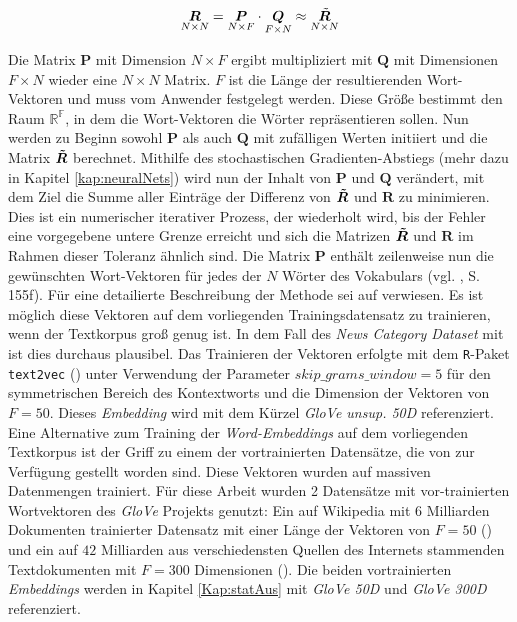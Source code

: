 \documentclass[a4paper,11pt]{article}
\begin{document}
\begin{equation*}
\underset{N \times N}{\bm{R}} = \underset{N \times F}{\bm{P}} \cdot \underset{F \times N}{\bm{Q}} \approx  \underset{N \times N}{\Tilde{\bm{R}}} 
\end{equation*}

Die Matrix $\bm{P}$ mit Dimension $N \times F$ ergibt multipliziert mit $\bm{Q}$ mit Dimensionen $F \times N$ wieder eine $N \times N$ Matrix. $F$ ist die Länge der resultierenden Wort-Vektoren und muss vom Anwender festgelegt werden. Diese Größe bestimmt den Raum $\mathbb{R^F}$, in dem die Wort-Vektoren die Wörter repräsentieren sollen. Nun werden zu Beginn sowohl $\bm{P}$ als auch $\bm{Q}$ mit zufälligen Werten initiiert und die Matrix $\bm{\Tilde{R}}$ berechnet. Mithilfe des stochastischen Gradienten-Abstiegs (mehr dazu in Kapitel \ref{kap:neuralNets}) wird nun der Inhalt von $\bm{P}$ und $\bm{Q}$ verändert, mit dem Ziel die Summe aller Einträge der Differenz von $\bm{\Tilde{R}}$ und $\bm{R}$ zu minimieren. Dies ist ein numerischer iterativer Prozess, der wiederholt wird, bis der Fehler eine vorgegebene untere Grenze erreicht und sich die Matrizen $\bm{\Tilde{R}}$ und $\bm{R}$ im Rahmen dieser Toleranz ähnlich sind. Die Matrix $\bm{P}$ enthält zeilenweise nun die gewünschten Wort-Vektoren für jedes der $N$ Wörter des Vokabulars (vgl. \cite{keras}, S. 155f). Für eine detailierte Beschreibung der Methode sei auf \cite{glovePaper} verwiesen. 
Es ist möglich diese Vektoren auf dem vorliegenden Trainingsdatensatz zu trainieren, wenn der Textkorpus groß genug ist. In dem Fall des \textit{News Category Dataset} mit  ist dies durchaus plausibel. Das Trainieren der Vektoren erfolgte mit dem \texttt{R}-Paket \texttt{text2vec} (\cite{text2vec}) unter Verwendung der Parameter $skip\_grams\_window = 5$ für den symmetrischen Bereich des Kontextworts und die Dimension der Vektoren von $F = 50$. Dieses \textit{Embedding} wird mit dem Kürzel \textit{GloVe unsup. 50D} referenziert. \\
Eine Alternative zum Training der \textit{Word-Embeddings} auf dem vorliegenden Textkorpus ist der Griff zu einem der vortrainierten Datensätze, die von \cite{gloveOnline}
zur Verfügung gestellt worden sind. Diese Vektoren wurden auf massiven Datenmengen trainiert. Für diese Arbeit wurden 2 Datensätze mit vor-trainierten Wortvektoren des \textit{GloVe} Projekts genutzt: Ein auf Wikipedia mit $6$ Milliarden Dokumenten trainierter Datensatz mit einer Länge der Vektoren von $F = 50$ (\cite{gloveWiki}) und ein auf $42$ Milliarden aus verschiedensten Quellen des Internets stammenden Textdokumenten mit $F = 300$ Dimensionen (\cite{gloveCommon}). Die beiden vortrainierten \textit{Embeddings} werden in Kapitel \ref{Kap:statAus} mit \textit{GloVe 50D} und \textit{GloVe 300D} referenziert.\\
\end{document}
